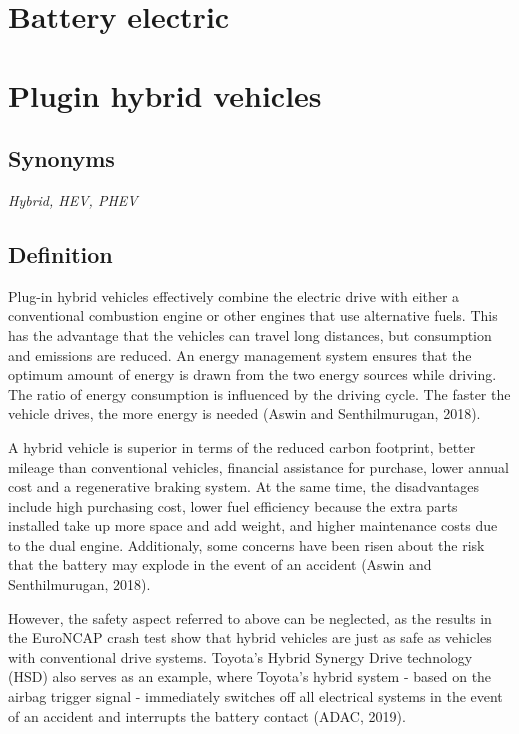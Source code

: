 \documentclass[
]{book}
\begin{document}
\hypertarget{battery-electric}{%
\section{Battery electric}\label{battery-electric}}

\hypertarget{plugin-hybrid-vehicles}{%
\section{Plugin hybrid vehicles}\label{plugin-hybrid-vehicles}}

\hypertarget{synonyms-12}{%
\subsection*{Synonyms}\label{synonyms-12}}

\emph{Hybrid, HEV, PHEV}

\hypertarget{definition-14}{%
\subsection*{Definition}\label{definition-14}}

Plug-in hybrid vehicles effectively combine the electric drive with either a conventional combustion engine or other engines that use alternative fuels. This has the advantage that the vehicles can travel long distances, but consumption and emissions are reduced. An energy management system ensures that the optimum amount of energy is drawn from the two energy sources while driving. The ratio of energy consumption is influenced by the driving cycle. The faster the vehicle drives, the more energy is needed (Aswin and Senthilmurugan, 2018).

A hybrid vehicle is superior in terms of the reduced carbon footprint, better mileage than conventional vehicles, financial assistance for purchase, lower annual cost and a regenerative braking system. At the same time, the disadvantages include high purchasing cost, lower fuel efficiency because the extra parts installed take up more space and add weight, and higher maintenance costs due to the dual engine. Additionaly, some concerns have been risen about the risk that the battery may explode in the event of an accident (Aswin and Senthilmurugan, 2018).

However, the safety aspect referred to above can be neglected, as the results in the EuroNCAP crash test show that hybrid vehicles are just as safe as vehicles with conventional drive systems. Toyota's Hybrid Synergy Drive technology (HSD) also serves as an example, where Toyota's hybrid system - based on the airbag trigger signal - immediately switches off all electrical systems in the event of an accident and interrupts the battery contact (ADAC, 2019).
\end{document}
